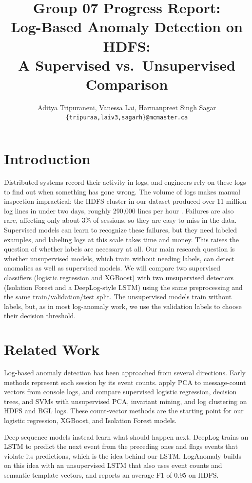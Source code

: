 \documentclass[11pt]{article}
\title{Group 07 Progress Report:\\Log-Based Anomaly Detection on HDFS:\\A Supervised vs.\ Unsupervised Comparison}
\author{Aditya Tripuraneni, Vanessa Lai, Harmanpreet Singh Sagar \\
  \texttt{\{tripuraa,laiv3,sagarh\}@mcmaster.ca} }
\begin{document}
\maketitle

\section{Introduction}

Distributed systems record their activity in logs, and engineers rely on these logs to
find out when something has gone wrong. The volume of logs makes manual inspection impractical:
the HDFS cluster in our dataset produced over 11 million log lines in under two days,
roughly 290,000 lines per hour \citep{Loghub,He2016}. Failures are also rare,
affecting only about 3\% of sessions, so they are easy to miss in the data.
Supervised models can learn to recognize these failures, but they need
labeled examples, and labeling logs at this scale takes time and money.
This raises the question of whether labels are necessary at all. Our main research question
is whether unsupervised models, which train without needing labels, can detect anomalies as
well as supervised models. We will compare two supervised classifiers
(logistic regression and XGBoost) with two unsupervised detectors (Isolation Forest
and a DeepLog-style LSTM) using the same preprocessing and the same
train/validation/test split. The unsupervised models train without labels, but, as in
most log-anomaly work, we use the validation labels to choose their decision threshold.

\section{Related Work}

Log-based anomaly detection has been approached from several directions. Early methods
represent each session by its event counts. \citet{Xu2009} apply PCA to
message-count vectors from console logs, and \citet{He2016} compare supervised
logistic regression, decision trees, and SVMs with unsupervised PCA, invariant mining, and
log clustering on HDFS and BGL logs. These count-vector methods are the starting point for
our logistic regression, XGBoost, and Isolation Forest models.

Deep sequence models instead learn what should happen next. DeepLog \citep{Du2017deeplog}
trains an LSTM to predict the next event from the preceding ones and flags events that
violate its predictions, which is the idea behind our LSTM. LogAnomaly \citep{Meng2019loganomaly}
builds on this idea with an unsupervised LSTM that also uses event counts and semantic
template vectors, and reports an average F1 of 0.95 on HDFS.
\end{document}

